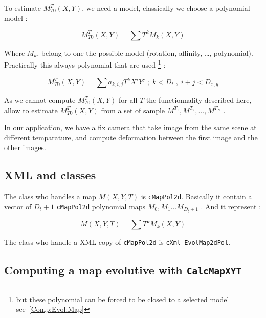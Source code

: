 To estimate $M^T_{T0}(X,Y)$, we need a model, classically we choose a polynomial model :

\begin{equation}
  M^T_{T0}(X,Y)  = \sum  T^k  M_k(X,Y)
\end{equation}

Where $M_k$, belong to one the possible model (rotation, affinity, \dots , polynomial). 
Practically this always polynomial that are used \footnote{but these polynomial can
be forced to be closed to a selected model see~\ref{Comp:Evol:Map}} :



\begin{equation}
  M^T_{T0}(X,Y)  = \sum a_{k,i,j}  T^k  X^i Y^j  \; ; \;  k<D_t \; , \; i+j<D_{x,y}
\end{equation}

As we cannot compute $M^T_{T0}(X,Y)$ for all $T$ the functionnality described here,
allow to estimate $M^T_{T0}(X,Y)$ from a set of sample $M^{T_1}, M^{T_2}, \dots , M^{T_N}$ .

In our application, we have a fix camera that take image from the same scene at different 
temparature, and compute deformation between the first image and the other images.



\subsection{XML and \CPP classes}

The  \CPP class who handles a map $M(X,Y,T)$ is {\tt cMapPol2d}.
Basically it contain a vector of $D_t+1$  {\tt cMapPol2d}  polynomial maps 
$M_0,M_1 \dots M_{D_t+1} $ .  And it represent :

\begin{equation}
   M(X,Y,T) = \sum T^k M_k(X,Y)
\end{equation}

The class who handle a XML copy of  {\tt cMapPol2d} is {\tt cXml\_EvolMap2dPol}.


\subsection{Computing a map evolutive with {\tt CalcMapXYT}}

